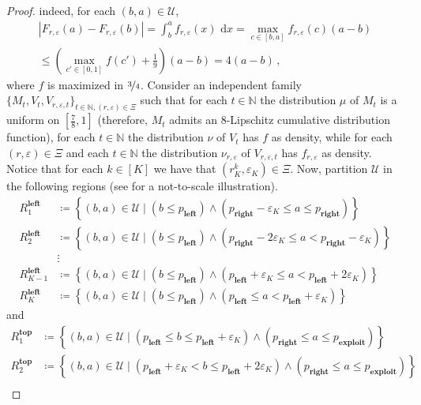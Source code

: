 \documentclass[final,12pt]{colt2025}
\newcommand{\cU}{\mathcal{U}}
\newcommand{\N}{\mathbb{N}}
\newcommand{\e}{\varepsilon}
\newcommand{\lrb}[1]{\left(#1\right)}
\newcommand{\lsb}[1]{\left[#1\right]}
\newcommand{\lcb}[1]{\left\{#1\right\}}
\newcommand{\labs}[1]{\left\lvert#1\right\rvert}
\newcommand{\dif}{\,\mathrm{d}}
\newcommand{\nP}{M}
\newcommand{\nZ}{V}
\newcommand{\nb}{b}
\newcommand{\ns}{a}
\begin{document}
{\begin{proof}
indeed, for each $(\nb, \ns) \in \cU$,
\begin{multline*}
    \labs{ F_{r,\e}(\ns) - F_{r,\e}(\nb) }
    = \int^\ns_\nb f_{r, \e}(x) \, \dif x
    = \max_{c \in [\nb,\ns]}f_{r, \e}(c) (\ns - \nb)
\\
    \le \left( \max_{c' \in [0, 1]} f(c') + \frac{1}{9} \right) (\ns - \nb)
    = 4 (\ns - \nb) \, ,
\end{multline*}
where $f$ is maximized in $\nicefrac{3}{4}$.
Consider an independent family $\{\nP_t,\nZ_t,\nZ_{r,\e,t}\}_{t \in \N, (r,\e)\in \Xi}$ such that for each $t \in \N$ the distribution $\mu$ of $\nP_t$ is a uniform on $\lsb{\frac{7}{8},1}$ (therefore, $M_t$ admits an $8$-Lipschitz cumulative distribution function), for each $t \in \N$ the distribution $\nu$ of $\nZ_t$ has $f$ as density, while for each $(r,\e) \in \Xi$ and each $t \in \N$ the distribution $\nu_{r,\e}$ of $\nZ_{r,\e,t}$ has $f_{r,\e}$ as density.
Notice that for each $k \in [K]$ we have that $(r_K^k,\e_K) \in \Xi$.
Now, partition $\cU$ in the following regions (see  for a not-to-scale illustration).
\begin{align*}
    R^{\textbf{left}}_1
&\coloneqq
    \lcb{ (\nb, \ns) \in \cU \mid (\nb \le p_{\textbf{left}}) \land \lrb{p_{\textbf{right}} - \e_K \le \ns \le p_{\textbf{right}}}}
\\
    R^{\textbf{left}}_{2}
&\coloneqq
    \lcb{ (\nb, \ns) \in \cU \mid (\nb \le p_{\textbf{left}}) \land \lrb{p_{\textbf{right}} - 2 \e_K \le \ns < p_{\textbf{right}} -\e_K}}
\\
&\vdots
\\
R^{\textbf{left}}_{K-1}
&\coloneqq
    \lcb{ (\nb, \ns) \in \cU \mid (\nb \le p_{\textbf{left}}) \land \lrb{p_{\textbf{left}} + \e_K \le \ns < p_{\textbf{left}} + 2\e_K}}
\\
    R^{\textbf{left}}_K
&\coloneqq
    \lcb{ (\nb, \ns) \in \cU \mid (\nb \le p_{\textbf{left}}) \land \lrb{p_{\textbf{left}} \le \ns < p_{\textbf{left}} + \e_K}}
\end{align*}
and
\begin{align*}
    R^{\textbf{top}}_1
&\coloneqq
    \lcb{ (\nb, \ns) \in \cU \mid (p_{\textbf{left}} \le \nb \le p_{\textbf{left}} + \e_K) \land \lrb{p_{\textbf{right}} \le \ns \le p_{\textbf{exploit}}}}
\\
    R^{\textbf{top}}_2
&\coloneqq
    \lcb{ (\nb, \ns) \in \cU \mid (p_{\textbf{left}} + \e_K < \nb \le p_{\textbf{left}} + 2 \e_K) \land \lrb{p_{\textbf{right}} \le \ns \le p_{\textbf{exploit}}}}
\\

\end{align*}
\end{proof}}
\end{document}
